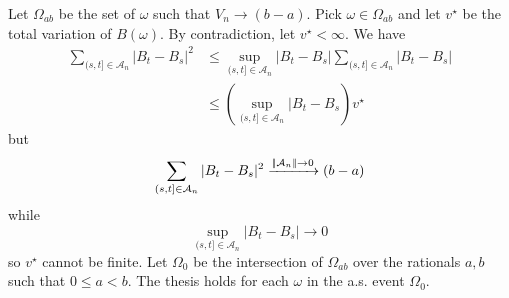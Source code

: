 \documentclass[12pt]{report}
\begin{document}
\begin{fancyproof}
	Let $\Omega_{ab}$ be the set of $\omega$ such that $V_{n}\to(b-a)$. Pick $\omega\in\Omega_{ab}$ and let $v^{\star}$ be the total variation of $B(\omega)$. By contradiction, let $v^{\star}<\infty$. We have
	\begin{align*}
		\sum_{(s,t]\in\mathcal{A}_{n}}|B_{t}-B_{s}|^{2}&\leq\sup_{(s,t]\in\mathcal{A}_{n}}|B_{t}-B_{s}|\sum_{(s,t]\in\mathcal{A}_{n}}|B_{t}-B_{s}|\\
		&\leq\left(\sup_{(s,t]\in\mathcal{A}_{n}}|B_{t}-B_{s}\right)v^{\star}
	\end{align*}
	but
	\begin{equation*}
		\sum_{(s,t]\in\mathcal{A}_{n}}|B_{t}-B_{s}|^{2}\xrightarrow{\left|\negthinspace\left|\mathcal{A}_{n}\right|\negthinspace\right|\to0}(b-a)
	\end{equation*}
	while 
	\begin{equation*}
		\sup_{(s,t]\in\mathcal{A}_{n}}|B_{t}-B_{s}|\to0
	\end{equation*}
	so $v^{\star}$ cannot be finite. Let $\Omega_{0}$ be the intersection of $\Omega_{ab}$ over the rationals $a,b$ such that $0\leq a<b$. The thesis holds for each $\omega$ in the a.s. event $\Omega_{0}$.
\end{fancyproof}
\end{document}
